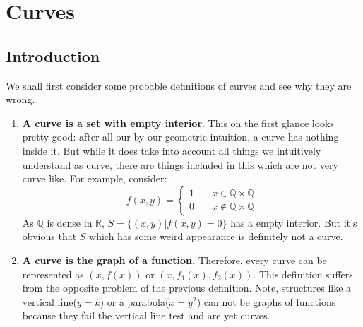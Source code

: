 \documentclass[oneside]{book}\twocolumn
\begin{document}
\chapter{Curves}
\section{Introduction}
We shall first consider some probable definitions of curves and see why they are wrong.
\begin{enumerate}
    \item \textbf{A curve is a set with empty interior}. This on the first glance looks pretty good: after all our by our geometric intuition, a curve has nothing inside it. But while it does take into account all things we intuitively understand as curve, there are things included in this which are not very curve like. For example, consider:
    $$f(x,y)=\begin{cases}1\quad&x\in\mathbb Q\times\mathbb Q\\ 0\quad&x\notin\mathbb Q\times\mathbb Q\end{cases}$$
    As $\mathbb Q$ is dense in $\mathbb R$, $S=\{(x,y)|f(x,y)=0\}$ has a empty interior. But it's obvious that $S$ which has some weird appearance is definitely not a curve.
  \item\textbf{A curve is the graph of a function.} Therefore, every curve can be represented as $(x,f(x))$ or $(x,f_1(x),f_2(x))$. This definition suffers from the opposite problem of the previous definition. Note, structures like a vertical line($y=k$) or a parabola($x=y^2$) can not be graphs of functions because they fail the vertical line test and are yet curves.
  \begin{figure}[H]
      \centering
      


\end{figure}
\end{enumerate}
\end{document}
